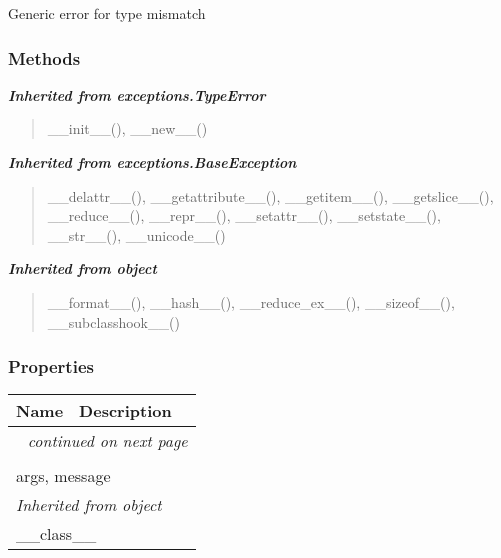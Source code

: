 Generic error for type mismatch



  \subsubsection{Methods}


\large{\textbf{\textit{Inherited from exceptions.TypeError}}}

\begin{quote}
\_\_init\_\_(), \_\_new\_\_()
\end{quote}

\large{\textbf{\textit{Inherited from exceptions.BaseException}}}

\begin{quote}
\_\_delattr\_\_(), \_\_getattribute\_\_(), \_\_getitem\_\_(), \_\_getslice\_\_(), \_\_reduce\_\_(), \_\_repr\_\_(), \_\_setattr\_\_(), \_\_setstate\_\_(), \_\_str\_\_(), \_\_unicode\_\_()
\end{quote}

\large{\textbf{\textit{Inherited from object}}}

\begin{quote}
\_\_format\_\_(), \_\_hash\_\_(), \_\_reduce\_ex\_\_(), \_\_sizeof\_\_(), \_\_subclasshook\_\_()
\end{quote}


  \subsubsection{Properties}

    \vspace{-1cm}
\hspace{\varindent}\begin{longtable}{|p{\varnamewidth}|p{\vardescrwidth}|l}
\cline{1-2}
\cline{1-2} \centering \textbf{Name} & \centering \textbf{Description}& \\
\cline{1-2}
\endhead\cline{1-2}\multicolumn{3}{r}{\small\textit{continued on next page}}\\\endfoot\cline{1-2}
\endlastfoot\multicolumn{2}{|l|}{\textit{Inherited from exceptions.BaseException}}\\
\multicolumn{2}{|p{\varwidth}|}{\raggedright args, message}\\
\cline{1-2}
\multicolumn{2}{|l|}{\textit{Inherited from object}}\\
\multicolumn{2}{|p{\varwidth}|}{\raggedright \_\_class\_\_}\\
\cline{1-2}
\end{longtable}

